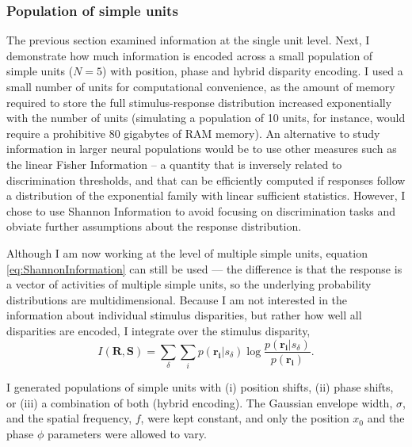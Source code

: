 \subsubsection*{Population of simple units}

The previous section examined information at the single unit level. Next, I demonstrate how much information is encoded across a small population of simple units ($N=5$) with position, phase and hybrid disparity encoding. I used a small number of units for computational convenience, as the amount of memory required to store the full stimulus-response distribution increased exponentially with the number of units (simulating a population of 10 units, for instance, would require a prohibitive 80 gigabytes of RAM memory). An alternative to study information in larger neural populations would be to use other measures such as the linear Fisher Information -- a quantity that is inversely related to discrimination thresholds, and that can be efficiently computed if responses follow a distribution of the exponential family with linear sufficient statistics\cite{Moreno-Bote:2014hy}. However, I chose to use Shannon Information to avoid focusing on discrimination tasks and obviate further assumptions about the response distribution. 

Although I am now working at the level of multiple simple units, equation \ref{eq:ShannonInformation} can still be used --- the difference is that the response is a vector of activities of multiple simple units, so the underlying probability distributions are multidimensional. Because I am not interested in the information about individual stimulus disparities, but rather how well all disparities are encoded, I integrate over the stimulus disparity,
\begin{equation}
  I(\mathbf{R}, \mathbf{S}) = \sum_\delta \sum_i p(\mathbf{r_i}|s_\delta) \log \frac{p(\mathbf{r_i}|s_\delta)}{p(\mathbf{r_i})}.
  \label{eq:ShannonInformationVector}
\end{equation}

I generated populations of simple units with (i) position shifts, (ii) phase shifts, or (iii) a combination of both (hybrid encoding). The Gaussian envelope width, $\sigma$, and the spatial frequency, $f$, were kept constant, and only the position $x_0$ and the phase $\phi$ parameters were allowed to vary. 


